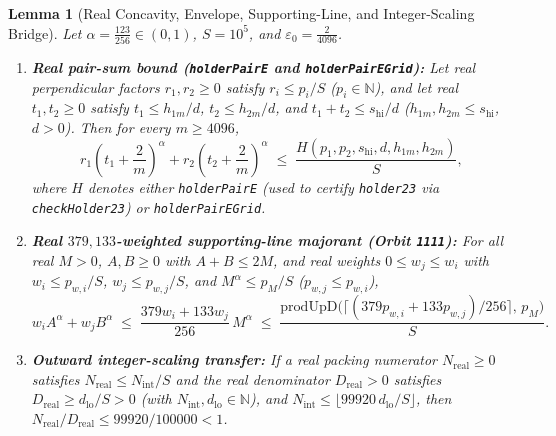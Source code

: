 \documentclass[11pt,reqno]{amsart}
\theoremstyle{plain}
\newtheorem{lemma}[theorem]{Lemma}
\theoremstyle{definition}
\theoremstyle{remark}
\DeclareRobustCommand{\_}{\ifmmode\text{\textunderscore}\else\textunderscore\allowbreak\fi}
\begin{document}
\begin{lemma}[Real Concavity, Envelope, Supporting-Line, and Integer-Scaling Bridge]\label{lem:real-bridge}
Let $\alpha = \frac{123}{256} \in (0, 1)$, $S = 10^5$, and $\varepsilon_0 = \frac{2}{4096}$.
\begin{enumerate}[label=(\roman*),leftmargin=2em]
  \item \textbf{Real pair-sum bound (\texttt{holderPairE} and \texttt{holderPairEGrid}):} Let real perpendicular factors $r_1, r_2 \ge 0$ satisfy $r_i \le p_i / S$ ($p_i \in \mathbb{N}$), and let real $t_1, t_2 \ge 0$ satisfy $t_1 \le h_{1m}/d$, $t_2 \le h_{2m}/d$, and $t_1 + t_2 \le s_{\mathrm{hi}}/d$ ($h_{1m}, h_{2m} \le s_{\mathrm{hi}}$, $d > 0$). Then for every $m \ge 4096$,
  \[
    r_1\!\left(t_1 + \frac{2}{m}\right)^{\!\alpha} + r_2\!\left(t_2 + \frac{2}{m}\right)^{\!\alpha}
    \;\le\; \frac{H(p_1, p_2, s_{\mathrm{hi}}, d, h_{1m}, h_{2m})}{S},
  \]
  where $H$ denotes either \texttt{holderPairE} (used to certify \texttt{holder23\_144} via \texttt{checkHolder23}) or \texttt{holderPairEGrid}.
  \item \textbf{Real $379,133$-weighted supporting-line majorant (Orbit \texttt{1111}):} For all real $M > 0$, $A, B \ge 0$ with $A + B \le 2M$, and real weights $0 \le w_j \le w_i$ with $w_i \le p_{w,i}/S$, $w_j \le p_{w,j}/S$, and $M^\alpha \le p_M / S$ ($p_{w,j} \le p_{w,i}$),
  \[
    w_i A^\alpha + w_j B^\alpha \;\le\; \frac{379 w_i + 133 w_j}{256}\, M^\alpha \;\le\; \frac{\mathrm{prodUpD}\bigl(\lceil (379 p_{w,i} + 133 p_{w,j})/256 \rceil,\, p_M\bigr)}{S}.
  \]
  \item \textbf{Outward integer-scaling transfer:} If a real packing numerator $N_{\mathrm{real}} \ge 0$ satisfies $N_{\mathrm{real}} \le N_{\mathrm{int}} / S$ and the real denominator $D_{\mathrm{real}} > 0$ satisfies $D_{\mathrm{real}} \ge d_{\mathrm{lo}} / S > 0$ (with $N_{\mathrm{int}}, d_{\mathrm{lo}} \in \mathbb{N}$), and $N_{\mathrm{int}} \le \lfloor 99920\, d_{\mathrm{lo}} / S \rfloor$, then $N_{\mathrm{real}} / D_{\mathrm{real}} \le 99920 / 100000 < 1$.
\end{enumerate}
\end{lemma}
\end{document}
